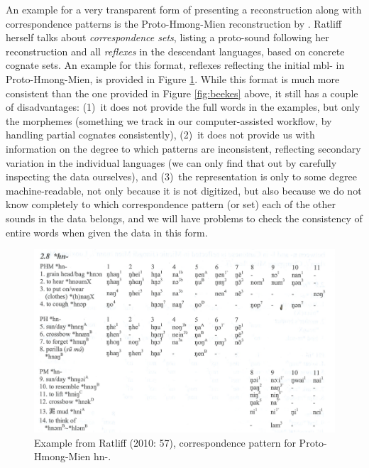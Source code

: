 \documentclass[xetex,svgnames]{scrartcl}
\begin{document}
 
An example for a very transparent form of presenting a reconstruction along with correspondence
patterns is the Proto-Hmong-Mien reconstruction by \citet{Ratliff2010}. Ratliff herself talks about
\emph{correspondence sets}, listing a proto-sound following her reconstruction and all
\emph{reflexes} in the descendant languages, based on concrete cognate sets. An example for this
format, reflexes reflecting the initial {\sil *mbl-} in Proto-Hmong-Mien, is provided in Figure
\ref{fig:ratliff}. While this format is much more consistent than the one provided in Figure
\ref{fig:beekes} above, it still has a couple of disadvantages: (1)~it does not provide the full
words in the examples, but only the morphemes (something we track in our computer-assisted workflow,
by handling partial cognates consistently), (2)~it does not provide us with information on the
degree to which patterns are inconsistent, reflecting secondary variation in the individual
languages (we can only find that out by carefully inspecting the data ourselves), and (3)~the
representation is only to some degree machine-readable, not only because it is not digitized, but
also because we do not know completely to which correspondence pattern (or set) each of the other
sounds in the data belongs, and we will have problems to check the consistency of entire words when
given the data in this form.


\begin{figure}[htb]
  \centering
  \includegraphics[width=\textwidth]{ratliff2010.png}
  \caption{Example from Ratliff (2010: 57), correspondence pattern for Proto-Hmong-Mien {\sil *hn-}.}
  \label{fig:ratliff}
\end{figure}
 
\end{document}
